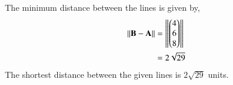 \documentclass[journal,12pt,twocolumn]{IEEEtran}
\begin{document}
The minimum distance between the lines is given by,
\begin{align}
\left\lVert\mathbf{B}-\mathbf{A}\right\rVert &= \left\lVert\begin{pmatrix}4\\6\\8\end{pmatrix}\right\rVert\\
&= 2\sqrt{29}
\end{align}
The shortest distance between the given lines is $2\sqrt{29}$ units.
\end{document}
